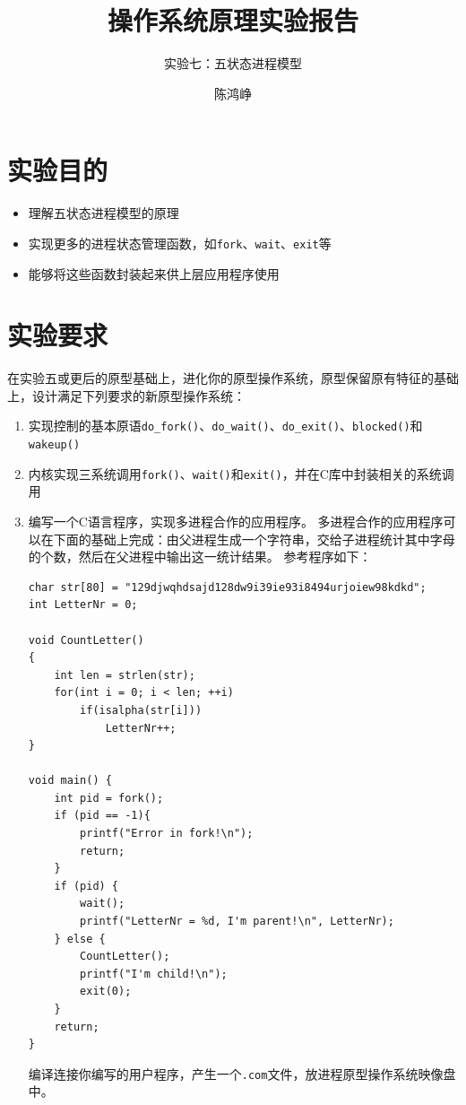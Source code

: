 \documentclass[logo,reportComp]{thesis}
\title{操作系统原理实验报告}
\subtitle{实验七：五状态进程模型}
\author{陈鸿峥}
\begin{document}
\maketitle

\section{实验目的}
\begin{itemize}
	\item 理解五状态进程模型的原理
	\item 实现更多的进程状态管理函数，如\verb'fork'、\verb'wait'、\verb'exit'等
	\item 能够将这些函数封装起来供上层应用程序使用
\end{itemize}

\section{实验要求}
在实验五或更后的原型基础上，进化你的原型操作系统，原型保留原有特征的基础上，设计满足下列要求的新原型操作系统：
\begin{enumerate}
	\item 实现控制的基本原语\verb'do_fork()'、\verb'do_wait()'、\verb'do_exit()'、\verb'blocked()'和\verb'wakeup()'
	\item 内核实现三系统调用\verb'fork()'、\verb'wait()'和\verb'exit()'，并在C库中封装相关的系统调用
	\item 编写一个C语言程序，实现多进程合作的应用程序。
多进程合作的应用程序可以在下面的基础上完成：由父进程生成一个字符串，交给子进程统计其中字母的个数，然后在父进程中输出这一统计结果。
参考程序如下：
\begin{lstlisting}
char str[80] = "129djwqhdsajd128dw9i39ie93i8494urjoiew98kdkd";
int LetterNr = 0;

void CountLetter()
{
	int len = strlen(str);
	for(int i = 0; i < len; ++i)
		if(isalpha(str[i]))
			LetterNr++;
}

void main() {
	int pid = fork();
	if (pid == -1){
		printf("Error in fork!\n");
		return;
	}
	if (pid) {
		wait();
		printf("LetterNr = %d, I'm parent!\n", LetterNr);
	} else {
		CountLetter();
		printf("I'm child!\n");
		exit(0);
	}
	return;
}
\end{lstlisting}
编译连接你编写的用户程序，产生一个\verb'.com'文件，放进程原型操作系统映像盘中。
\end{enumerate}
\end{document}
